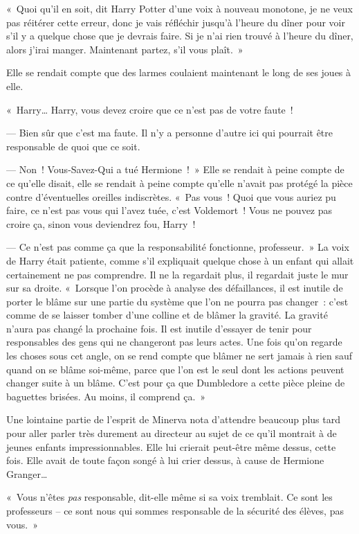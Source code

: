 «~Quoi qu'il en soit, dit Harry Potter d'une voix à nouveau monotone, je ne veux pas réitérer cette erreur, donc je vais réfléchir jusqu'à l'heure du dîner pour voir s'il y a quelque chose que je devrais faire.
Si je n'ai rien trouvé à l'heure du dîner, alors j'irai manger.
Maintenant partez, s'il vous plaît.~»

Elle se rendait compte que des larmes coulaient maintenant le long de ses joues à elle.

«~Harry…
Harry, vous devez croire que ce n'est pas de votre faute~!

--- Bien sûr que c'est ma faute.
Il n'y a personne d'autre ici qui pourrait être responsable de quoi que ce soit.

--- Non~!
Vous-Savez-Qui a tué Hermione~!~»
Elle se rendait à peine compte de ce qu'elle disait, elle se rendait à peine compte qu'elle n'avait pas protégé la pièce contre d'éventuelles oreilles indiscrètes.
«~Pas vous~!
Quoi que vous auriez pu faire, ce n'est pas vous qui l'avez tuée, c'est Voldemort~!
Vous ne pouvez pas croire ça, sinon vous deviendrez fou, Harry~!

--- Ce n'est pas comme ça que la responsabilité fonctionne, professeur.~»
La voix de Harry était patiente, comme s'il expliquait quelque chose à un enfant qui allait certainement ne pas comprendre.
Il ne la regardait plus, il regardait juste le mur sur sa droite.
«~Lorsque l'on procède à analyse des défaillances, il est inutile de porter le blâme sur une partie du système que l'on ne pourra pas changer~: c'est comme de se laisser tomber d'une colline et de blâmer la gravité.
La gravité n'aura pas changé la prochaine fois.
Il est inutile d'essayer de tenir pour responsables des gens qui ne changeront pas leurs actes.
Une fois qu'on regarde les choses sous cet angle, on se rend compte que blâmer ne sert jamais à rien sauf quand on se blâme soi-même, parce que l'on est le seul dont les actions peuvent changer suite à un blâme.
C'est pour ça que Dumbledore a cette pièce pleine de baguettes brisées.
Au moins, il comprend ça.~»

Une lointaine partie de l'esprit de Minerva nota d'attendre beaucoup plus tard pour aller parler très durement au directeur au sujet de ce qu'il montrait à de jeunes enfants impressionnables.
Elle lui crierait peut-être même dessus, cette fois.
Elle avait de toute façon songé à lui crier dessus, à cause de Hermione Granger…

«~Vous n'êtes \emph{pas} responsable, dit-elle même si sa voix tremblait.
Ce sont les professeurs -- ce sont nous qui sommes responsable de la sécurité des élèves, pas vous.~»

